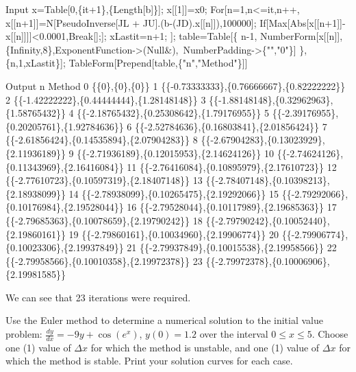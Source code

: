 \documentclass[10pt,twoside,openany]{memoir}
\begin{document}
\begin{mdframed}
\begin{solution}
\begin{mmaCell}[moredefined={it, A, b, x0, JD, JL, JU, x, n, xLastit, \
    table, CellToTeX},morepattern={cell}]{Input}
x=Table[0,\{it+1\},\{Length[b]\}];
x[[1]]=x0;
For[n=1,n<=it,n++,
  x[[n+1]]=N[PseudoInverse[JL + JU].(b-(JD).x[[n]]),100000];
  If[Max[Abs[x[[n+1]]-x[[n]]]]<0.0001,Break[];];
  xLastit=n+1;
];
table=Table[\{
  n-1,
  NumberForm[x[[n]],\{Infinity,8\},ExponentFunction->(Null&),\
    NumberPadding->\{"","0"\}]
\},\{n,1,xLastit\}];
TableForm[Prepend[table,\{"n","Method"\}]]
\end{mmaCell}
\begin{mmaCell}[addtoindex=13,form=TableForm]{Output}
    n	  Method
    0	  \{\{0\},\{0\},\{0\}\}
    1	  \{\{-0.73333333\},\{0.76666667\},\{0.82222222\}\}
    2	  \{\{-1.42222222\},\{0.44444444\},\{1.28148148\}\}
    3	  \{\{-1.88148148\},\{0.32962963\},\{1.58765432\}\}
    4	  \{\{-2.18765432\},\{0.25308642\},\{1.79176955\}\}
    5	  \{\{-2.39176955\},\{0.20205761\},\{1.92784636\}\}
    6	  \{\{-2.52784636\},\{0.16803841\},\{2.01856424\}\}
    7	  \{\{-2.61856424\},\{0.14535894\},\{2.07904283\}\}
    8	  \{\{-2.67904283\},\{0.13023929\},\{2.11936189\}\}
    9	  \{\{-2.71936189\},\{0.12015953\},\{2.14624126\}\}
    10	\{\{-2.74624126\},\{0.11343969\},\{2.16416084\}\}
    11	\{\{-2.76416084\},\{0.10895979\},\{2.17610723\}\}
    12	\{\{-2.77610723\},\{0.10597319\},\{2.18407148\}\}
    13	\{\{-2.78407148\},\{0.10398213\},\{2.18938099\}\}
    14	\{\{-2.78938099\},\{0.10265475\},\{2.19292066\}\}
    15	\{\{-2.79292066\},\{0.10176984\},\{2.19528044\}\}
    16	\{\{-2.79528044\},\{0.10117989\},\{2.19685363\}\}
    17	\{\{-2.79685363\},\{0.10078659\},\{2.19790242\}\}
    18	\{\{-2.79790242\},\{0.10052440\},\{2.19860161\}\}
    19	\{\{-2.79860161\},\{0.10034960\},\{2.19906774\}\}
    20	\{\{-2.79906774\},\{0.10023306\},\{2.19937849\}\}
    21	\{\{-2.79937849\},\{0.10015538\},\{2.19958566\}\}
    22	\{\{-2.79958566\},\{0.10010358\},\{2.19972378\}\}
    23	\{\{-2.79972378\},\{0.10006906\},\{2.19981585\}\}
  \end{mmaCell}
            We can see that 23 iterations were required.
        \end{solution}
        \end{mdframed}
\newpage
\begin{exercise}
    Use the Euler method to determine a numerical solution to the initial value problem: $\frac{dy}{dx} = -9y + \cos(e^x)$, $y(0) = 1.2$ over the interval $0 \leq x \leq 5$. Choose one (1) value of $\Delta x$ for which the method is unstable, and one (1) value of $\Delta x$ for which the method is stable. Print your solution curves for each case.
\end{exercise}
\end{document}

